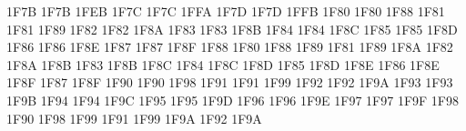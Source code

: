 \setcclcuc 1F7B 1F7B 1FEB %
\setcclcuc 1F7C 1F7C 1FFA %
\setcclcuc 1F7D 1F7D 1FFB %
\setcclcuc 1F80 1F80 1F88 %
\setcclcuc 1F81 1F81 1F89 %
\setcclcuc 1F82 1F82 1F8A %
\setcclcuc 1F83 1F83 1F8B %
\setcclcuc 1F84 1F84 1F8C %
\setcclcuc 1F85 1F85 1F8D %
\setcclcuc 1F86 1F86 1F8E %
\setcclcuc 1F87 1F87 1F8F %
\setcclcuc 1F88 1F80 1F88 %
\setcclcuc 1F89 1F81 1F89 %
\setcclcuc 1F8A 1F82 1F8A %
\setcclcuc 1F8B 1F83 1F8B %
\setcclcuc 1F8C 1F84 1F8C %
\setcclcuc 1F8D 1F85 1F8D %
\setcclcuc 1F8E 1F86 1F8E %
\setcclcuc 1F8F 1F87 1F8F %
\setcclcuc 1F90 1F90 1F98 %
\setcclcuc 1F91 1F91 1F99 %
\setcclcuc 1F92 1F92 1F9A %
\setcclcuc 1F93 1F93 1F9B %
\setcclcuc 1F94 1F94 1F9C %
\setcclcuc 1F95 1F95 1F9D %
\setcclcuc 1F96 1F96 1F9E %
\setcclcuc 1F97 1F97 1F9F %
\setcclcuc 1F98 1F90 1F98 %
\setcclcuc 1F99 1F91 1F99 %
\setcclcuc 1F9A 1F92 1F9A %
